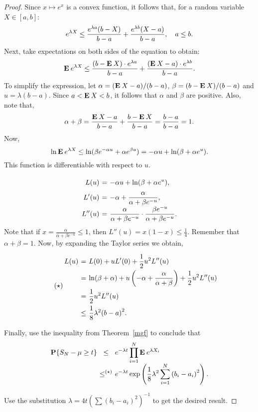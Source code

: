 \begin{proof}
  Since $x \mapsto e^x$ is a convex function, it follows that, for a random variable $X \in [a,b]$:
  \[ e^{\lambda X} \leq \frac{e^{\lambda a}(b-X)}{b-a} + \frac{e^{\lambda b}(X-a)}{b-a},\hspace*{1em} a \leq b. \]
  Next, take expectations on both sides of the equation to obtain:
  \[ \mathbf{E}\: e^{\lambda X} \leq \frac{(b-\mathbf{E}\: X) \cdot e^{\lambda a}}{b-a} + \frac{(\mathbf{E}\: X -a) \cdot e^{\lambda b}}{b-a}. \]
  To simplify the expression, let $\alpha = (\mathbf{E}\: X -a)/(b-a)$, $\beta = (b-\mathbf{E}\: X)/(b-a)$ and $u = \lambda (b-a)$. Since $a < \mathbf{E}\: X < b$, it follows that $\alpha$ and $\beta$ are positive. Also, note that,
  \[ \alpha + \beta = \frac{\mathbf{E}\: X-a}{b-a} + \frac{b-\mathbf{E}\: X}{b-a} = \frac{b-a}{b-a} = 1. \] 
  Now,
  \[ \ln \mathbf{E}\: e^{\lambda X} \leq \ln (\beta e^{-\alpha u} + \alpha e^{\beta u}) = -\alpha u + \ln(\beta + \alpha e^{u}). \] 
  This function is differentiable with respect to $u$.
  \[\everymath{\displaystyle}\arraycolsep=1.8pt\def\arraystretch{1.8}
    \begin{array}{rcl}
    L(u) & = & -\alpha u + \ln(\beta + \alpha e^{u}),\\
    L'(u) & = & -\alpha + \frac{\alpha}{\alpha + \beta e^{-u}},\\
    L''(u) & = & \frac{\alpha}{\alpha + \beta e^{-u}} \cdot \frac{\beta e^{-u}}{\alpha + \beta e^{-u}}.
  \end{array} \]
  Note that if $x = \frac{\alpha}{\alpha + \beta e^{-u}} \leq 1$, then $L''(u) = x(1-x) \leq \frac{1}{4}$. Remember that $\alpha + \beta = 1$. Now, by expanding the Taylor series we obtain,
  \begin{equation}
    \tag{$\star$} \everymath{\displaystyle}\arraycolsep=1.8pt\def\arraystretch{2}
  \begin{array}{rcl}
    L(u) & = & L(0) + uL'(0) + \frac{1}{2} u^2 L''(u)\\
    & = &\ln(\beta + \alpha) + u \left(-\alpha + \frac{\alpha}{\alpha + \beta}\right) + \frac{1}{2} u^2 L''(u) \\
    & = & \frac{1}{2} u^2 L''(u)\\
    &\leq & \frac{1}{8}\lambda^2 {(b-a)}^2.
  \end{array}
  \end{equation}

  Finally, use the inequality from Theorem~\ref{mgf} to conclude that
  \[\everymath{\displaystyle}\arraycolsep=1.8pt\def\arraystretch{2}
    \begin{array}{rcl}
      \P\{S_N-\mu \geq t\} & \leq & e^{-\lambda t} \prod_{i = 1}^N \E e^{\lambda X_i} \\
      &\leq^{(\star)} & e^{-\lambda t} \exp\left(\frac{1}{8}\lambda^2 \sum_{i = 1}^{N} {(b_i-a_i)}^2\right).
    \end{array}\] 

  Use the substitution $\lambda = 4t {\left(\sum{(b_i-a_i)}^2\right)}^{-1}$ to get the desired result.

\end{proof}



